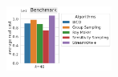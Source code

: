 \begin{figure}
{    \includegraphics[width=0.31\textwidth]{figures/real-costs-Benchmark-k40.pdf}
  }
\end{figure}





    






